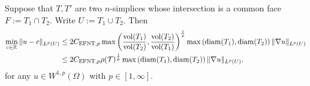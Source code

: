 \documentclass[12pt,a4paper]{article}
\begin{document}
\begin{lemma}\label{lemma:poincarefriedrichsoverfacepatch}
    Suppose that $T, T'$ are two $n$-simplices whose intersection is a common face $F := T_1 \cap T_2$. 
    Write $U := T_1 \cup T_2$. 
    Then 
    \begin{align*}
        \min\limits_{ c \in {\mathbb R} }
        \| u - c \|_{L^{p}(U)}
        &
        \leq 
        2 C_{{\rm EFNT},p}
        \max\left( 
            \frac{ \operatorname{vol}(T_1) }{ \operatorname{vol}(T_2) }
            ,
            \frac{ \operatorname{vol}(T_2) }{ \operatorname{vol}(T_1) }
        \right)^{\frac 1 p}
        \max\left( {\operatorname{diam}}(T_1), {\operatorname{diam}}(T_2) \right)
        \| \nabla u \|_{L^{p}(U)}
        \\&
        \leq 
        2 C_{{\rm EFNT},p}
        \rho({\mathcal T})^{\frac 1 p}
        \max\left( {\operatorname{diam}}(T_1), {\operatorname{diam}}(T_2) \right)
        \| \nabla u \|_{L^{p}(U)}
        .
    \end{align*}
    for any $u \in W^{1,p}(\Omega)$ with $p \in [1,\infty]$.
\end{lemma}
\end{document}
